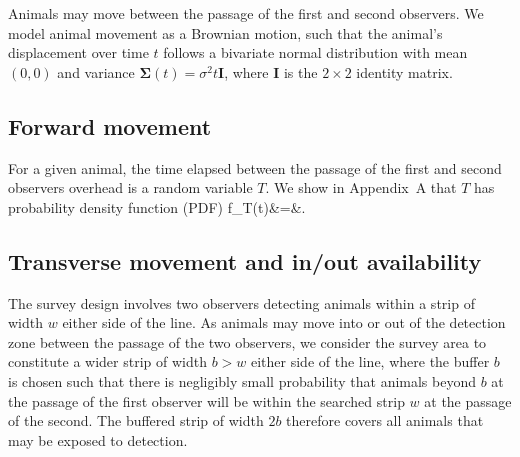\documentclass[useAMS, usenatbib, referee]{biom}\usepackage[]{graphicx}\usepackage[]{color}
\begin{document}
Animals may move between the passage of the first and second observers. We model animal movement as a Brownian motion, such that the animal's displacement over time $t$ follows a bivariate normal distribution with mean $(0,0)$ and variance $\bm{\Sigma}(t)=\sigma^2t\bm{I}$, where $\bm{I}$ is the $2\times 2$ identity matrix.


\subsection{Forward movement}

For a given animal, the time elapsed between the passage of the first and second observers overhead is a random variable $T$. We show in Appendix~A that $T$ has probability density function (PDF)
\be
f_{T}(t)&=&.
\label{eq:fTt}
\ee






\subsection{Transverse movement and in/out availability}


The survey design involves two observers detecting animals within a strip of width $w$ either side of the line. As animals may move into or out of the detection zone between the passage of the two observers, we consider the survey area to constitute a wider strip of width $b>w$ either side of the line, where the buffer $b$ is chosen such that there is negligibly small probability that animals beyond $b$ at the passage of the first observer will be within the searched strip $w$ at the passage of the second. The buffered strip of width $2b$ therefore covers all animals that may be exposed to detection.
\end{document}
